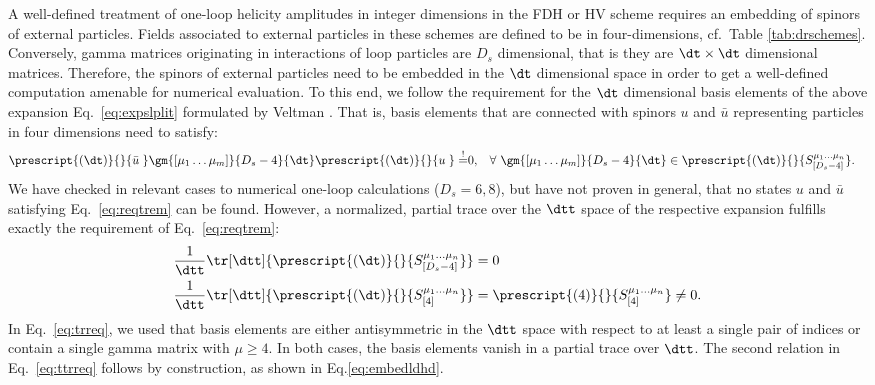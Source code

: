 A well-defined treatment of one-loop helicity amplitudes in
integer dimensions in the FDH or HV scheme requires an embedding of spinors of external
particles. Fields associated to external particles in these schemes
are defined to be in four-dimensions, cf.~Table
\ref{tab:drschemes}. Conversely, gamma matrices originating in
interactions of loop particles are $D_s$ dimensional, that is
they are $\dt \times \dt$ dimensional matrices. Therefore, the spinors
of external particles need to be embedded in the $\dt$ dimensional
space in order to get a well-defined computation amenable for
numerical evaluation. To this end, we follow the requirement for the $\dt$
dimensional basis elements of the above expansion Eq.~\eqref{eq:expslplit} formulated by Veltman
\cite{Veltman:1988au}. That is, basis elements that are connected with spinors $u$ and $\bar{u}$ representing particles in four
dimensions need to satisfy:
\begin{align}\label{eq:reqtrem}
 \prescript{(\dt)}{}{ \bar{u}^{\phantom{[}}} \gm{[\mu_1\ldots\mu_m]}{D_s-4}{\dt}
 \prescript{(\dt)}{}{u^{\phantom{[}}} \overset{!}{=}&0,&
\forall\  \gm{[\mu_1\ldots\mu_m]}{D_s-4}{\dt}&\in \prescript{(\dt)}{}{S_{[D_s-4]}^{\mu_1\ldots \mu_n}}  .
\end{align}
We have checked in relevant cases to numerical one-loop calculations ($D_s=6,8$), but have not proven in general,
that no states $u$ and $\bar{u}$ satisfying Eq.~\eqref{eq:reqtrem} can be
found. However, a normalized, partial trace over the
$\dtt$ space of the respective expansion fulfills exactly the
requirement of Eq.~\eqref{eq:reqtrem}:
\begin{align}
  \frac{1}{\dtt}\tr[\dtt]{  \prescript{(\dt)}{}{S_{[D_s-4]}^{\mu_1\ldots \mu_n}}}&=0\label{eq:trreq}\\
  \frac{1}{\dtt} \tr[\dtt]{  \prescript{(\dt)}{}{S_{[4]}^{\mu_1\ldots
        \mu_n}}}&= \prescript{(4)}{}{S_{[4]}^{\mu_1\ldots
        \mu_n}}\neq 0.\label{eq:ttrreq}
\end{align}
In Eq.~\eqref{eq:trreq}, we used that basis elements are either
antisymmetric in the $\dtt$ space with respect to at least a single
pair of indices or contain a single gamma
matrix with $\mu \geq 4$. In both cases, the basis elements vanish in
a partial trace over $\dtt$. The second relation in
Eq.~\eqref{eq:ttrreq} follows by construction, as shown in Eq.\eqref{eq:embedldhd}.



